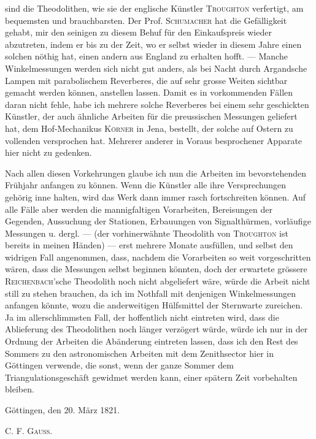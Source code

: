 %
sind die Theodolithen, wie sie der englische Künstler \textsc{Troughton} verfertigt, am bequemsten und brauchbarsten. Der Prof. \textsc{Schumacher} hat die Gefälligkeit gehabt, mir den seinigen zu diesem Behuf für den Einkaufspreis wieder abzutreten, indem er bis zu der Zeit, wo er selbst wieder in diesem Jahre einen solchen nöthig hat, einen andern aus England zu erhalten hofft. — Manche Winkelmessungen werden sich nicht gut anders, als bei Nacht durch Argandsche Lampen mit parabolischem Reverberes, die auf sehr grosse Weiten sichtbar gemacht werden können, anstellen lassen. Damit es in vorkommenden Fällen daran nicht fehle, habe ich mehrere solche Reverberes bei einem sehr geschickten Künstler, der auch ähnliche Arbeiten für die preussischen Messungen geliefert hat, dem Hof-Mechanikus \textsc{Körner} in Jena, bestellt, der solche auf Ostern zu vollenden versprochen hat. Mehrerer anderer in Voraus besprochener Apparate hier nicht zu gedenken.

Nach allen diesen Vorkehrungen glaube ich nun die Arbeiten im bevorstehenden Frühjahr anfangen zu können. Wenn die Künstler alle ihre Versprechungen gehörig inne halten, wird das Werk dann immer rasch fortschreiten können. Auf alle Fälle aber werden die mannigfaltigen Vorarbeiten, Bereisungen der Gegenden, Aussuchung der Stationen, Erbauungen von Signalthürmen, vorläufige Messungen u. dergl. — (der vorhinerwähnte Theodolith von \textsc{Troughton} ist bereits in meinen Händen) — erst mehrere Monate ausfüllen, und selbst den widrigen Fall angenommen, dass, nachdem die Vorarbeiten so weit vorgeschritten wären, dass die Messungen selbst beginnen könnten, doch der erwartete grössere \textsc{Reichenbach}'sche Theodolith noch nicht abgeliefert wäre, würde die Arbeit nicht still zu stehen brauchen, da ich im Nothfall mit denjenigen Winkelmessungen anfangen könnte, wozu die anderweitigen Hülfsmittel der Sternwarte zureichen. Ja im allerschlimmsten Fall, der hoffentlich nicht eintreten wird, dass die Ablieferung des Theodolithen noch länger verzögert würde, würde ich nur in der Ordnung der Arbeiten die Abänderung eintreten lassen, dass ich den Rest des Sommers zu den astronomischen Arbeiten mit dem Zenithsector hier in Göttingen verwende, die sonst, wenn der ganze Sommer dem Triangulationsgeschäft gewidmet werden kann, einer spätern Zeit vorbehalten bleiben.

Göttingen, den 20. März 1821.
\begin{flushright}C. F. \textsc{Gauss}.\end{flushright}

